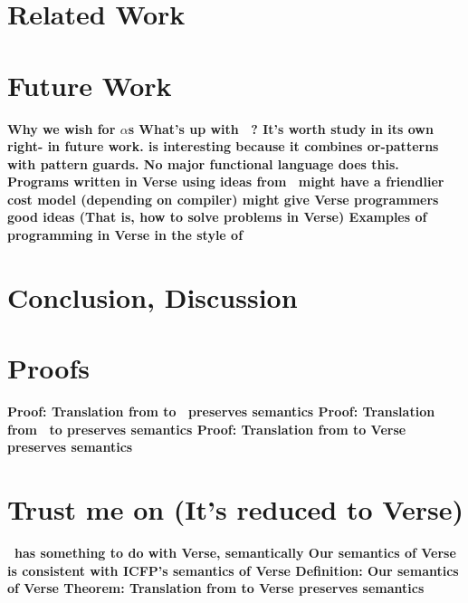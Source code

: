 \documentclass[manuscript,screen,review, 12pt]{acmart}
\begin{document}
\section{Related Work}
\section{Future Work}
\begin{outline}[enumerate]
    \1 \bf{Why we wish for $\alpha$s}
    \1 \bf{What's up with \PPlus\ ? It's worth study in its own right- in future work.}
    \2 \bf{\PPlus is interesting because it combines or-patterns with pattern }
        guards. No major functional language does this. 
    \1 \bf{Programs written in Verse using ideas from \VMinus\ might have a }
    friendlier cost model (depending on compiler)
    \1 \bf{\VMinus might give Verse programmers good ideas }
        (That is, how to solve problems in Verse)
    \2 \bf{Examples of programming in Verse in the style of \VMinus }
\end{outline}

\section{Conclusion, Discussion}

\renewcommand\thesection{\Alph{section}}
\setcounter{section}{0}
\section{Proofs}
\begin{outline}
    \1 \bf{Proof: Translation from \VMinus to \D\ preserves semantics }
    \1 \bf{Proof: Translation from \PPlus\ to \VMinus preserves semantics }
    \1 \bf{Proof: Translation from \VMinus to Verse preserves semantics     }
\end{outline}

\section{Trust me on \VMinus (It's reduced to Verse)}
\begin{outline}
    \1 \bf{\VMinus\ has something to do with Verse, semantically }
    \1 \bf{Our semantics of Verse is consistent with ICFP's semantics of Verse }
    \1 \bf{Definition: Our semantics of Verse}
    \1 \bf{Theorem: Translation from \VMinus to Verse preserves semantics     }
\end{outline}
\end{document}
